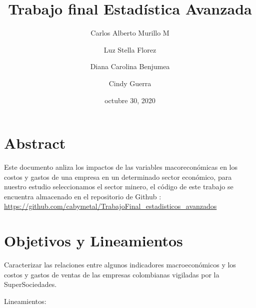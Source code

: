 \documentclass[
  11pt,
]{book}
\title{Trabajo final Estadística Avanzada}
\author{Carlos Alberto Murillo M \and Luz Stella Florez \and Diana Carolina Benjumea \and Cindy Guerra}
\date{octubre 30, 2020}
\begin{document}
\frontmatter
\maketitle

{
\setcounter{tocdepth}{2}
\tableofcontents
}
\mainmatter
\hypertarget{abstract}{%
\chapter*{Abstract}\label{abstract}}

Este documento anliza los impactos de las variables macoreconómicas en
los costos y gastos de una empresa en un determinado sector económico,
para nuestro estudio seleccionamos el sector minero, el código de este
trabajo se encuentra almacenado en el repositorio de Github :
\url{https://github.com/cabymetal/TrabajoFinal_estadisticos_avanzados}

\hypertarget{objetivos-y-lineamientos}{%
\chapter{Objetivos y Lineamientos}\label{objetivos-y-lineamientos}}

Caracterizar las relaciones entre algunos indicadores macroeconómicos y
los costos y gastos de ventas de las empresas colombianas vigiladas por
la SuperSociedades.

Lineamientos:
\end{document}
